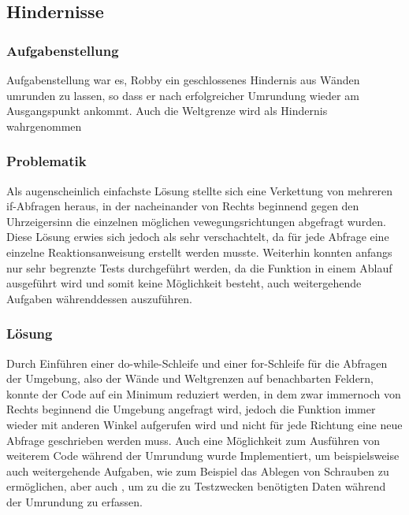 \subsection{Hindernisse}

\subsubsection*{Aufgabenstellung}
Aufgabenstellung war es, Robby ein geschlossenes Hindernis aus Wänden umrunden zu lassen, so dass er nach erfolgreicher Umrundung wieder am Ausgangspunkt ankommt.
Auch die Weltgrenze wird als Hindernis wahrgenommen

\subsubsection*{Problematik}
Als augenscheinlich einfachste Lösung stellte sich eine Verkettung von mehreren if-Abfragen heraus, in der nacheinander von Rechts beginnend gegen den Uhrzeigersinn die einzelnen möglichen vewegungsrichtungen abgefragt wurden. Diese Lösung erwies sich jedoch als sehr verschachtelt, da für jede Abfrage eine einzelne Reaktionsanweisung erstellt werden musste.
Weiterhin konnten anfangs nur sehr begrenzte Tests durchgeführt werden, da die Funktion in einem Ablauf ausgeführt wird und somit keine Möglichkeit besteht, auch weitergehende Aufgaben währenddessen auszuführen.


\subsubsection*{Lösung}
Durch Einführen einer do-while-Schleife und einer for-Schleife für die Abfragen der Umgebung, also der Wände und Weltgrenzen auf benachbarten Feldern, konnte der Code auf ein Minimum reduziert werden, in dem  zwar immernoch von Rechts beginnend die Umgebung angefragt wird, jedoch die Funktion immer wieder mit anderen Winkel aufgerufen wird und nicht für jede Richtung eine neue Abfrage geschrieben werden muss.
Auch eine Möglichkeit zum Ausführen von weiterem Code während der Umrundung wurde Implementiert, um beispielsweise auch weitergehende Aufgaben, wie zum Beispiel das Ablegen von Schrauben zu ermöglichen, aber auch , um zu die zu Testzwecken benötigten Daten während der Umrundung zu erfassen.
